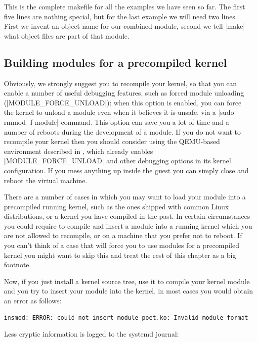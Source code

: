 \documentclass[10pt, oneside]{book}
\begin{document}
This is the complete makefile for all the examples we have seen so far.
The first five lines are nothing special, but for the last example we will need two lines.
First we invent an object name for our combined module, second we tell \sh|make| what object files are part of that module.

\subsection{Building modules for a precompiled kernel}
\label{sec:precompiled}
Obviously, we strongly suggest you to recompile your kernel, so that you can enable a number of useful debugging features,
such as forced module unloading (\cpp|MODULE_FORCE_UNLOAD|): when this option is enabled,
you can force the kernel to unload a module even when it believes it is unsafe, via a \sh|sudo rmmod -f module| command.
This option can save you a lot of time and a number of reboots during the development of a module.
If you do not want to recompile your kernel then you should consider using the QEMU-based
environment described in , which already enables
\cpp|MODULE_FORCE_UNLOAD| and other debugging options in its kernel configuration.
If you mess anything up inside the guest you can simply close and reboot the virtual machine.

There are a number of cases in which you may want to load your module into a precompiled running kernel,
such as the ones shipped with common Linux distributions, or a kernel you have compiled in the past.
In certain circumstances you could require to compile and insert a module into a running kernel which you are not allowed to recompile,
or on a machine that you prefer not to reboot.
If you can't think of a case that will force you to use modules for a precompiled kernel you might want to skip this and treat the rest of this chapter as a big footnote.

Now, if you just install a kernel source tree, use it to compile your kernel module and you try to insert your module into the kernel,
in most cases you would obtain an error as follows:

\begin{verbatim}
insmod: ERROR: could not insert module poet.ko: Invalid module format
\end{verbatim}

Less cryptic information is logged to the systemd journal:
\end{document}
